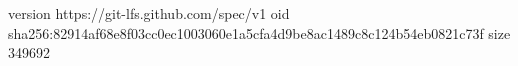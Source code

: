 version https://git-lfs.github.com/spec/v1
oid sha256:82914af68e8f03cc0ec1003060e1a5cfa4d9be8ac1489c8c124b54eb0821c73f
size 349692
